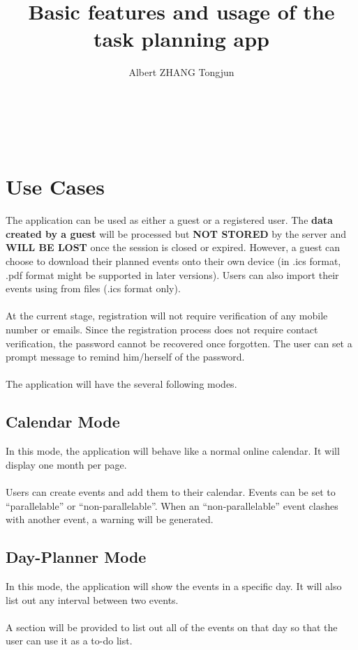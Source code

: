 \documentclass{article}[12pt]
\title{Basic features and usage of the task planning app}
\author{Albert ZHANG Tongjun}
\begin{document}
\maketitle
\tableofcontents
~\\~\\


\section{Use Cases}
The application can be used as either a guest or a registered user.
The \textbf{data created by a guest} will be processed but \textbf{NOT STORED} by the server and \textbf{WILL BE LOST} once the session is closed or expired.
However, a guest can choose to download their planned events onto their own device (in .ics format, .pdf format might be supported in later versions).
Users can also import their events using from files (.ics format only).
~\\~\\
At the current stage, registration will not require verification of any mobile number or emails.
Since the registration process does not require contact verification, the password cannot be recovered once forgotten. The user can set a prompt message to remind him/herself of the password.
~\\~\\
The application will have the several following modes.
~\\

\subsection{Calendar Mode}
In this mode, the application will behave like a normal online calendar.
It will display one month per page.
~\\~\\
Users can create events and add them to their calendar.
Events can be set to ``parallelable'' or ``non-parallelable''.
When an ``non-parallelable'' event clashes with another event, a warning will be generated.
~\\

\subsection{Day-Planner Mode}
In this mode, the application will show the events in a specific day.
It will also list out any interval between two events.
~\\~\\
A section will be provided to list out all of the events on that day so that the user can use it as a to-do list.
~\\
\end{document}
